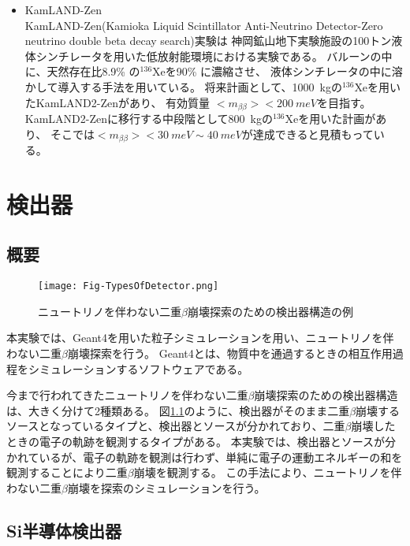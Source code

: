 \documentclass[a4paper,10pt]{jreport}
\begin{document}
\begin{itemize}
	\item KamLAND-Zen \\
	KamLAND-Zen(Kamioka Liquid Scintillator Anti-Neutrino Detector-Zero neutrino double beta decay search)実験は
	神岡鉱山地下実験施設の100トン液体シンチレータを用いた低放射能環境における実験である。
	バルーンの中に、天然存在比8.9\% の$^{136}$Xeを90\% に濃縮させ、
	液体シンチレータの中に溶かして導入する手法を用いている。
	将来計画として、\SI{1000}{kg}の$^{136}$Xeを用いたKamLAND2-Zenがあり、
	有効質量 $< m_{\beta\beta} > < \SI{200}{meV}$を目指す。
	KamLAND2-Zenに移行する中段階として\SI{800}{kg}の$^{136}$Xeを用いた計画があり、
	そこでは$< m_{\beta\beta} > < \SI{30}{meV} \sim \SI{40}{meV}$が達成できると見積もっている。
	\cite{KamLAND-Zen}
	
\end{itemize}



\chapter{検出器}



\section{概要}

\begin{figure}[H]
	\center
	\texttt{[image: Fig-TypesOfDetector.png]}
	\caption{ニュートリノを伴わない二重$\beta$崩壊探索のための検出器構造の例} \label{Fig-TyepseOfDetector}
\end{figure}

本実験では、Geant4を用いた粒子シミュレーションを用い、ニュートリノを伴わない二重$\beta$崩壊探索を行う。
Geant4とは、物質中を通過するときの相互作用過程をシミュレーションするソフトウェアである。

今まで行われてきたニュートリノを伴わない二重$\beta$崩壊探索のための検出器構造は、大きく分けて2種類ある。
図\ref{Fig-TyepseOfDetector}のように、検出器がそのまま二重$\beta$崩壊するソースとなっているタイプと、検出器とソースが分かれており、二重$\beta$崩壊したときの電子の軌跡を観測するタイプがある。
本実験では、検出器とソースが分かれているが、電子の軌跡を観測は行わず、単純に電子の運動エネルギーの和を観測することにより二重$\beta$崩壊を観測する。
この手法により、ニュートリノを伴わない二重$\beta$崩壊を探索のシミュレーションを行う。



\section{Si半導体検出器}
\end{document}
